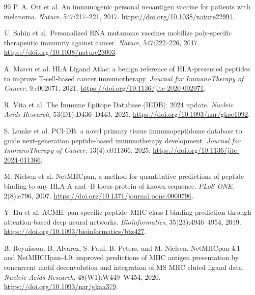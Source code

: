 \begingroup
\small
\begin{thebibliography}{99}
P. A. Ott et al.
\newblock An immunogenic personal neoantigen vaccine for patients with melanoma.
\newblock \emph{Nature}, 547:217--221, 2017.
\newblock \url{https://doi.org/10.1038/nature22991}.

U. Sahin et al.
\newblock Personalized RNA mutanome vaccines mobilize poly-specific therapeutic immunity against cancer.
\newblock \emph{Nature}, 547:222--226, 2017.
\newblock \url{https://doi.org/10.1038/nature23003}.

A. Marcu et al.
\newblock HLA Ligand Atlas: a benign reference of HLA-presented peptides to improve T-cell-based cancer immunotherapy.
\newblock \emph{Journal for ImmunoTherapy of Cancer}, 9:e002071, 2021.
\newblock \url{https://doi.org/10.1136/jitc-2020-002071}.

R. Vita et al.
\newblock The Immune Epitope Database (IEDB): 2024 update.
\newblock \emph{Nucleic Acids Research}, 53(D1):D436--D443, 2025.
\newblock \url{https://doi.org/10.1093/nar/gkae1092}.

S. Lemke et al.
\newblock PCI-DB: a novel primary tissue immunopeptidome database to guide next-generation peptide-based immunotherapy development.
\newblock \emph{Journal for ImmunoTherapy of Cancer}, 13(4):e011366, 2025.
\newblock \url{https://doi.org/10.1136/jitc-2024-011366}.

M. Nielsen et al.
\newblock NetMHCpan, a method for quantitative predictions of peptide binding to any HLA-A and -B locus protein of known sequence.
\newblock \emph{PLoS ONE}, 2(8):e796, 2007.
\newblock \url{https://doi.org/10.1371/journal.pone.0000796}.

Y. Hu et al.
\newblock ACME: pan-specific peptide--MHC class I binding prediction through attention-based deep neural networks.
\newblock \emph{Bioinformatics}, 35(23):4946--4954, 2019.
\newblock \url{https://doi.org/10.1093/bioinformatics/btz427}.

B. Reynisson, B. Alvarez, S. Paul, B. Peters, and M. Nielsen.
\newblock NetMHCpan-4.1 and NetMHCIIpan-4.0: improved predictions of MHC antigen presentation by concurrent motif deconvolution and integration of MS MHC eluted ligand data.
\newblock \emph{Nucleic Acids Research}, 48(W1):W449--W454, 2020.
\newblock \url{https://doi.org/10.1093/nar/gkaa379}.


\end{thebibliography}
